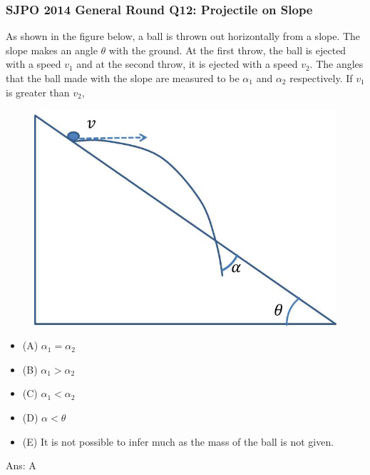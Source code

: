 \documentclass{article}
\begin{document}
\begin{samepage}
\subsubsection{SJPO 2014 General Round Q12: Projectile on Slope}
As shown in the figure below, a ball is thrown out horizontally from a slope. The slope makes an angle $\theta$ with the ground. At the first throw, the ball is ejected with a speed $v_1$ and at the second throw, it is ejected with a speed $v_2$. The angles that the ball made with the slope are measured to be $\alpha_1$ and $\alpha_2$ respectively. If $v_1$ is greater than $v_2$,\\
 \begin{figure} 
\includegraphics[width=\linewidth]{images/2014q12.png}
\end{figure}
\begin{itemize}
\item[](A) $\alpha_1=\alpha_2$
\item[](B) $\alpha_1>\alpha_2$
\item[](C) $\alpha_1<\alpha_2$
\item[](D) $\alpha<\theta$
\item[](E) It is not possible to infer much as the mass of the ball is not given.
\end{itemize}
Ans: \ifpaper A \fi \\[10pt]
\end{samepage}
\end{document}
